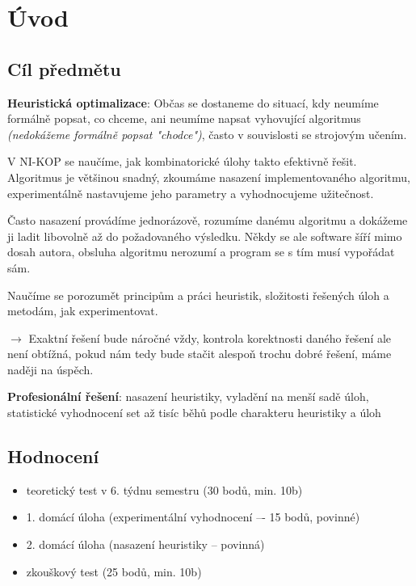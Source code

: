 \section{Úvod}

\vspace{12pt}

\subsection{Cíl předmětu}

\textbf{Heuristická optimalizace}: Občas se dostaneme do situací, kdy neumíme formálně popsat, co chceme, ani neumíme napsat vyhovující algoritmus \textit{(nedokážeme formálně popsat "chodce")}, často v souvislosti se strojovým učením.

V NI-KOP se naučíme, jak kombinatorické úlohy takto efektivně řešit. Algoritmus je většinou snadný, zkoumáme nasazení implementovaného algoritmu, experimentálně nastavujeme jeho parametry a vyhodnocujeme užitečnost.

Často nasazení provádíme jednorázově, rozumíme danému algoritmu a doká\-žeme ji ladit libovolně až do požadovaného výsledku. Někdy se ale software šíří mimo dosah autora, obsluha algoritmu nerozumí a program se s tím musí vypořádat sám.

Naučíme se porozumět principům a práci heuristik, složitosti řešených úloh a metodám, jak experimentovat.

$\to$ Exaktní řešení bude náročné vždy, kontrola korektnosti daného řešení ale není obtížná, pokud nám tedy bude stačit alespoň trochu dobré řešení, máme naději na úspěch.

\textbf{Profesionální řešení}: nasazení heuristiky, vyladění na menší sadě úloh, statistické vyhodnocení set až tisíc běhů podle charakteru heuristiky a úloh

\subsection{Hodnocení}

\begin{itemize}
    \item teoretický test v 6. týdnu semestru (30 bodů, min. 10b)
    \item 1. domácí úloha (experimentální vyhodnocení –- 15 bodů, povinné)
    \item 2. domácí úloha (nasazení heuristiky -- povinná)
    \item zkouškový test (25 bodů, min. 10b)
\end{itemize}

